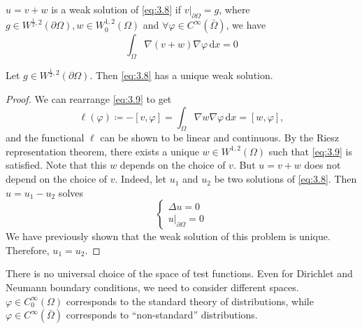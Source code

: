 \documentclass{report}
\begin{document}
\begin{definition}{}{}
    \(u = v + w\) is a weak solution of \ref{eq:3.8} if \(\left. v \right|_{\partial \Omega} = g\), where \(g \in W^{\frac{1}{2}, 2}(\partial \Omega), w \in W^{1, 2}_{0}(\Omega)\) and \(\forall \varphi \in C^{\infty}(\bar{\Omega})\), we have 
    \begin{equation}\label{eq:3.9}
        \int_{\Omega} \nabla (v+w) \nabla \varphi \,\mathrm{d}x = 0
    \end{equation}    
\end{definition}

\begin{theorem}{}{}
    Let \(g \in W^{\frac{1}{2}, 2}(\partial \Omega)\). Then \ref{eq:3.8} has a unique weak solution.
\end{theorem}

\begin{proof}
    We can rearrange \ref{eq:3.9} to get
    \[
        \ell(\varphi) \coloneqq -[v, \varphi] = \int_{\Omega} \nabla w \nabla \varphi \,\mathrm{d}x = [w, \varphi],
    \]
    and the functional \(\ell\) can be shown to be linear and continuous. By the Riesz representation theorem, there exists a unique \(w \in W^{1, 2}(\Omega)\) such that \ref{eq:3.9} is satisfied. Note that this \(w\) depends on the choice of \(v\). But \(u = v + w\) does not depend on the choice of \(v\). Indeed, let \(u_1\) and \(u_2\) be two solutions of \ref{eq:3.8}. Then \(u = u_1 - u_2\) solves
    \[
        \begin{cases}
            \Delta u = 0 \\
            \left. u \right|_{\partial \Omega} = 0
        \end{cases}
    \]
    We have previously shown that the weak solution of this problem is unique. Therefore, \(u_1 = u_2\). 
\end{proof}

\begin{note}
    There is no universal choice of the space of test functions. Even for Dirichlet and Neumann boundary conditions, we need to consider different spaces. \(\varphi \in C^{\infty}_{0}(\Omega)\) corresponds to the standard theory of distributions, while \(\varphi \in C^{\infty}(\bar{\Omega})\) corresponds to ``non-standard'' distributions.
\end{note}
\end{document}
